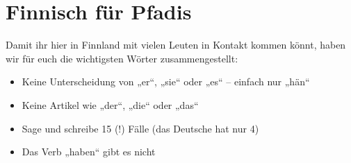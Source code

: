 \section{Finnisch für Pfadis}

Damit ihr hier in Finnland mit vielen Leuten in Kontakt kommen könnt, haben wir für euch die wichtigsten Wörter zusammengestellt:

\begin{itemize}
	\item Keine Unterscheidung von „er“, „sie“ oder „es“ – einfach nur „hän“
	\item Keine Artikel wie „der“, „die“ oder „das“
	\item Sage und schreibe 15 (!) Fälle (das Deutsche hat nur 4)
	\item Das Verb „haben“ gibt es nicht
\end{itemize}

